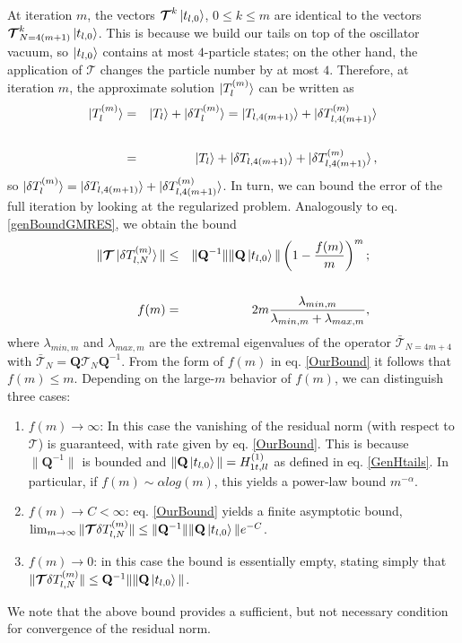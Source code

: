 \documentclass[twocolumn,secnumarabic,amssymb, nobibnotes, aps, prd]{revtex4-2}
\newcommand{\bea}{\begin{eqnarray}}
\newcommand{\eea}{\end{eqnarray}}
\begin{document}
At iteration $m$, the vectors $\boldsymbol{\mathcal{T}}^{k}\ket{t_{l,0}}$, $0\leq k\leq m$ are identical to the vectors $\boldsymbol{\mathcal{T}}_{N=4\left(m+1\right)}^{k}\ket{t_{l,0}}$. This is because we build our tails on top of the oscillator vacuum, so $\ket{t_{l,0}}$ contains at most $4$-particle states; on the other hand, the application of $\boldsymbol{\mathcal{T}}$ changes the particle number by at most $4$. Therefore, at iteration $m$, the approximate solution $\ket{T_l^{\left(m\right)}}$ can be written as
\bea
\ket{T_l^{\left(m\right)}}&=&\ket{T_l}+\ket{\delta T_l^{\left(m\right)}}=\ket{T_{l,4(m+1)}}+\ket{\delta T_{l,4(m+1)}^{\left(m\right)}}\cr\cr
&=&\ket{T_l}+\ket{\delta T_{l,4(m+1)}}+\ket{\delta T_{l,4(m+1)}^{\left(m\right)}},
\eea
so $\ket{\delta T_l^{\left(m\right)}}=\ket{\delta T_{l,4(m+1)}}+\ket{\delta T_{l,4(m+1)}^{\left(m\right)}}$. In turn, we can bound the error of the full iteration by looking at the regularized problem.
Analogously to eq. \eqref{genBoundGMRES}, we obtain the bound
\bea
\|\boldsymbol{\mathcal{T}}\ket{\delta T_{l,N}^{(m)}}\|&\leq&\|\mathbf{Q}^{-1}\|\|\mathbf{Q}\ket{t_{l,0}}\|\left(1-\frac{f(m)}{m}\right)^m;\cr\cr
f(m)&=&2m\frac{\lambda_{min,m}}{\lambda_{min,m}+\lambda_{max,m}},\label{OurBound}
\eea
 where $\lambda_{min,m}$ and $\lambda_{max,m}$ are the extremal eigenvalues of the operator $\bar{\boldsymbol{\mathcal{T}}}_{N=4m+4}$with $\bar{\boldsymbol{\mathcal{T}}}_{N}=\mathbf{Q}\boldsymbol{\mathcal{T}}_{N}\mathbf{Q}^{-1}$. From the form of $f(m)$ in eq. \eqref{OurBound} it follows that $f(m)\leq m$. Depending on the large-$m$ behavior of $f(m)$, we can distinguish three cases:
 \begin{enumerate}
 \item $f(m)\rightarrow\infty$:  In this case the vanishing of the residual norm (with respect to $\boldsymbol{\mathcal{T}}$) is guaranteed, with rate given by eq. \eqref{OurBound}.  This is because $\|\mathbf{Q}^{-1}\|$ is bounded and $\|\mathbf{Q}\ket{t_{l,0}}\|=H_{1t,ll}^{(1)}$ as defined in eq. \eqref{GenHtails}. In particular, if $f(m)\sim \alpha log(m)$, this yields a power-law bound $m^{-\alpha}$.
 \item $f(m)\rightarrow C<\infty$: eq. \eqref{OurBound} yields a finite asymptotic bound, $\lim_{m\rightarrow\infty}\|\boldsymbol{\mathcal{T}}\delta T_{l,N}^{(m)}\|\leq\|\mathbf{Q}^{-1}\|\|\mathbf{Q}\ket{t_{l,0}}\|e^{-C}$.  
 \item $f(m)\rightarrow0$: in this case the bound is essentially empty, stating simply that $\|\boldsymbol{\mathcal{T}}\delta T_{l,N}^{(m)}\|\leq\mathbf{Q}^{-1}\|\|\mathbf{Q}\ket{t_{l,0}}\|$.
 \end{enumerate} 
 We note that the above bound provides a sufficient, but not necessary condition for convergence of the residual norm.
 
\end{document}
